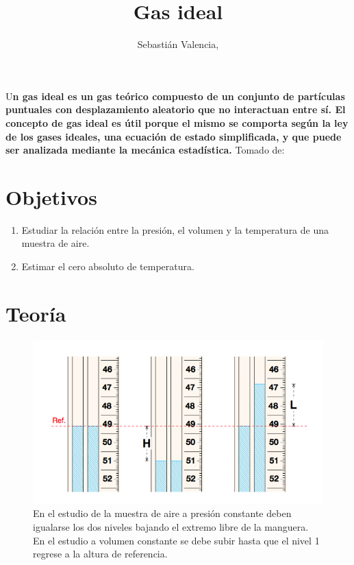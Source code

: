 \documentclass[DIV=calc, paper=a4, fontsize=11pt, twocolumn, spanish]{scrartcl}	 %
\title{Gas ideal} %
\author{Sebastián Valencia, } %
\date{} %
\newcommand{\initial}[1]{ %
\lettrine[lines=3,lhang=0.3,nindent=0em]{
\color{DarkGoldenrod}
{\textsf{#1}}}{}}
\begin{document}
\maketitle %

\thispagestyle{fancy} %


\initial{U}\textbf{n gas ideal es un gas teórico compuesto de un conjunto de partículas puntuales con desplazamiento aleatorio que no interactuan entre sí. El concepto de gas ideal es útil porque el mismo se comporta según la ley de los gases ideales, una ecuación de estado simplificada, y que puede ser analizada mediante la mecánica estadística.} Tomado de: \cite{Wikipedia}


\section*{Objetivos}

\begin{enumerate}
\item Estudiar la relación entre la presión, el volumen y la temperatura de una muestra de aire.
\item Estimar el cero absoluto de temperatura.
\end{enumerate}


\section*{Teoría}

\begin{figure}[htbp]
\centering
	\includegraphics[scale=0.7]{data/img/proc}
	\caption{En el estudio de la muestra de aire a presión constante deben igualarse los dos niveles bajando el extremo libre de la manguera. En el estudio a volumen constante se debe subir hasta que el nivel 1 regrese a la altura de referencia.}
\end{figure}
\end{document}
